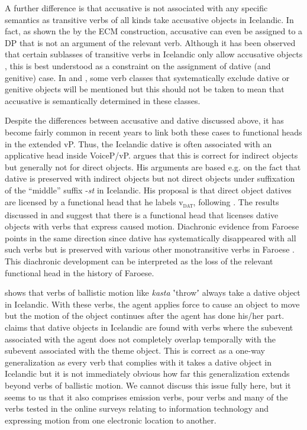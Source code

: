 \documentclass[output=paper,modfonts,nonflat,colorlinks,citecolor=brown]{langsci/langscibook}
\begin{document}
{A further difference is that accusative is not associated with any specific semantics as transitive verbs of all kinds take accusative objects in Icelandic. In fact, as shown the by the ECM construction, accusative can even be assigned to a DP that is not an argument of the relevant verb. Although it has been observed that certain sublasses of transitive verbs in Icelandic only allow accusative objects \citep{Jónsson2013a}, this is best understood as a constraint on the assignment of dative (and genitive) case. In  and , some verb classes that systematically exclude dative or genitive objects will be mentioned but this should not be taken to mean that accusative is semantically determined in these classes.

Despite the differences between accusative and dative discussed above, it has become fairly common in recent years to link both these cases to functional heads in the extended vP. Thus, the Icelandic dative is often associated with an applicative head inside VoiceP/vP. \citet[128-138]{Wood2015} argues that this is correct for indirect objects but generally not for direct objects. His arguments are based e.g. on the fact that dative is preserved with indirect objects but not direct objects under suffixation of the “middle” suffix -\textit{st} in Icelandic. His proposal is that direct object datives are licensed by a functional head that he labels v\textsc{\textsubscript{dat}}, following \citet{Svenonius2006alternations}. The results discussed in  and  suggest that there is a functional head that licenses dative objects with verbs that express caused motion. Diachronic evidence from Faroese points in the same direction since dative has systematically disappeared with all such verbs but is preserved with various other monotransitive verbs in Faroese \citep{Jónsson2009}. This diachronic development can be interpreted as the loss of the relevant functional head in the history of Faroese.

\citet{Svenonius2002} shows that verbs of ballistic motion like \textit{kasta} ʽthrowʼ always take a dative object in Icelandic. With these verbs, the agent applies force to cause an object to move but the motion of the object continues after the agent has done his/her part. \citet{Svenonius2002} claims that dative objects in Icelandic are found with verbs where the subevent associated with the agent does not completely overlap temporally with the subevent associated with the theme object. This is correct as a one-way generalization as every verb that complies with it takes a dative object in Icelandic but it is not immediately obvious how far this generalization extends beyond verbs of ballistic motion. We cannot discuss this issue fully here, but it seems to us that it also comprises emission verbs, pour verbs and many of the verbs tested in the online surveys relating to information technology and expressing motion from one electronic location to another. 

}
\end{document}
